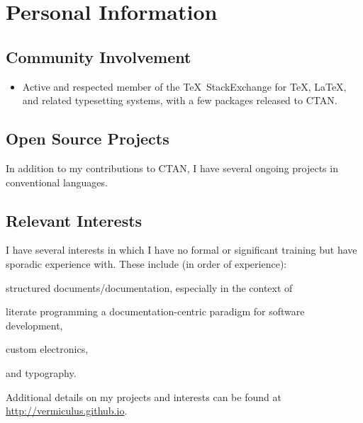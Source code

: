 \documentclass[
textout=\jobname.cv.txt,
textout preamble = preamble.txt,
]{bettercv}
\begin{document}
\section{Personal Information}
\subsection{Community Involvement}
\begin{itemize}
\item Active and respected member of the \TeX\ StackExchange for
  \TeX, \LaTeX, and related typesetting systems,
  with a few packages released to CTAN.
\end{itemize}
\subsection{Open Source Projects \hfill {}}
In addition to my contributions to CTAN,
  I have several ongoing projects in conventional languages.


\subsection{Relevant Interests}
I have several interests in which I have no formal or significant training
  but have sporadic experience with.
These include (in order of experience):
\begin{itemize*}
\item structured documents\slash documentation, especially in the context of
\item literate programming \Dash a documentation-centric paradigm for software development,
\item custom electronics,
\item and typography.
\end{itemize*}

\vfill

\centering
Additional details on my projects and interests can be found at
  \url{http://vermiculus.github.io}.
\vfill
\vfill
\appendix
\todos
\end{document}
